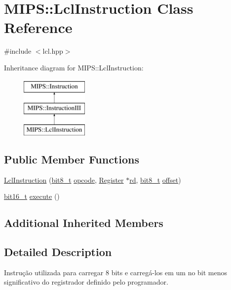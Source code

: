 \hypertarget{classMIPS_1_1LclInstruction}{}\section{M\+I\+PS\+:\+:Lcl\+Instruction Class Reference}
\label{classMIPS_1_1LclInstruction}


{\ttfamily \#include $<$lcl.\+hpp$>$}

Inheritance diagram for M\+I\+PS\+:\+:Lcl\+Instruction\+:\begin{figure}[H]
\begin{center}
\leavevmode
\includegraphics[height=3.000000cm]{classMIPS_1_1LclInstruction}
\end{center}
\end{figure}
\subsection*{Public Member Functions}
\begin{DoxyCompactItemize}
\item 
\hyperlink{classMIPS_1_1LclInstruction_aae1096406aaf2cbf94f7755d05869d05}{Lcl\+Instruction} (\hyperlink{core_8hpp_a6074bae122ae7b527864eec42c728c3c}{bit8\+\_\+t} \hyperlink{classMIPS_1_1Instruction_a45cc6808b5dde8a5d41067d148b55476}{opcode}, \hyperlink{classMIPS_1_1Register}{Register} $\ast$\hyperlink{classMIPS_1_1InstructionIII_a76e7b218fc57cd2fc559bf72498090b6}{rd}, \hyperlink{core_8hpp_a6074bae122ae7b527864eec42c728c3c}{bit8\+\_\+t} \hyperlink{classMIPS_1_1InstructionIII_ad0ebd3b6e7594fc583e9a409bf99a6c7}{offset})
\item 
\hyperlink{core_8hpp_adc265a970bc35995b5879784bbb3f1b7}{bit16\+\_\+t} \hyperlink{classMIPS_1_1LclInstruction_a713c7c0e33c9df49f677abfd95f363db}{execute} ()
\end{DoxyCompactItemize}
\subsection*{Additional Inherited Members}


\subsection{Detailed Description}
Instrução utilizada para carregar 8 bits e carregá-\/los em um no bit menos significativo do registrador definido pelo programador.

